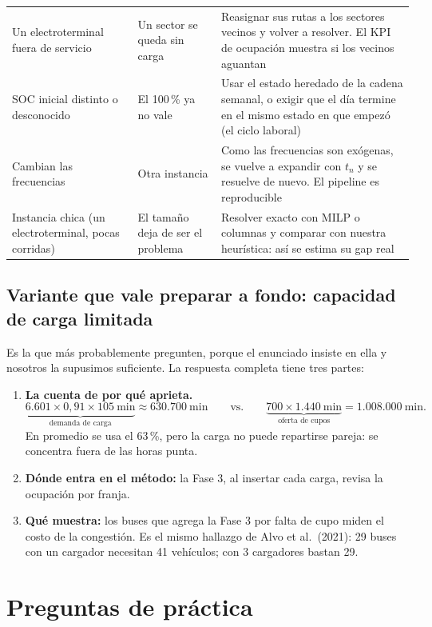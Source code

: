 \documentclass[11pt,a4paper,parskip=half]{scrartcl}
\newcounter{preg}
\begin{document}
\begin{longtable}{@{}L{3.3cm}L{4.4cm}L{7.9cm}@{}}
Un electroterminal fuera de servicio & Un sector se queda sin carga & Reasignar sus rutas a los sectores vecinos y volver a resolver. El KPI de ocupación muestra si los vecinos aguantan \\
SOC inicial distinto o desconocido & El 100\,\% ya no vale & Usar el estado heredado de la cadena semanal, o exigir que el día termine en el mismo estado en que empezó (el ciclo laboral) \\
Cambian las frecuencias & Otra instancia & Como las frecuencias son exógenas, se vuelve a expandir con $t_n$ y se resuelve de nuevo. El pipeline es reproducible \\
Instancia chica (un electroterminal, pocas corridas) & El tamaño deja de ser el problema & Resolver exacto con MILP o columnas y comparar con nuestra heurística: así se estima su gap real \\
\end{longtable}
\endgroup

\subsection*{Variante que vale preparar a fondo: capacidad de carga limitada}
Es la que más probablemente pregunten, porque el enunciado insiste en ella y nosotros la supusimos suficiente. La respuesta completa tiene tres partes:
\begin{enumerate}
  \item \textbf{La cuenta de por qué aprieta.}
  \[
    \underbrace{6.601 \times 0{,}91 \times 105\ \text{min}}_{\text{demanda de carga}} \approx 630.700\ \text{min}
    \qquad\text{vs.}\qquad
    \underbrace{700 \times 1.440\ \text{min}}_{\text{oferta de cupos}} = 1.008.000\ \text{min}.
  \]
  En promedio se usa el 63\,\%, pero la carga no puede repartirse pareja: se concentra fuera de las horas punta.
  \item \textbf{Dónde entra en el método:} la Fase 3, al insertar cada carga, revisa la ocupación por franja.
  \item \textbf{Qué muestra:} los buses que agrega la Fase 3 por falta de cupo miden el costo de la congestión. Es el mismo hallazgo de Alvo et al.\ (2021): 29 buses con un cargador necesitan 41 vehículos; con 3 cargadores bastan 29.
\end{enumerate}

\section{Preguntas de práctica}
\label{sec:practica}
\end{document}
